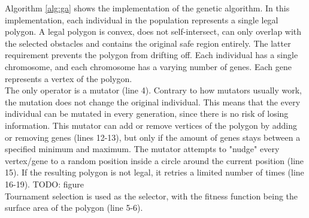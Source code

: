 Algorithm \ref{alg:ga} shows the implementation of the genetic algorithm. In this implementation, each individual in the population represents a single legal polygon. A legal polygon is convex, does not self-intersect, can only overlap with the selected obstacles and contains the original safe region entirely. The latter requirement prevents the polygon from drifting off. Each individual has a single chromosome, and each chromosome has a varying number of genes. Each gene represents a vertex of the polygon.\\
The only operator is a mutator (line 4). Contrary to how mutators usually work, the mutation does not change the original individual. This means that the every individual can be mutated in every generation, since there is no risk of losing information. This mutator can add or remove vertices of the polygon by adding or removing genes (lines 12-13), but only if the amount of genes stays between a specified minimum and maximum. The mutator attempts to "nudge" every vertex/gene to a random position inside a circle around the current position (line 15). If the resulting polygon is not legal, it retries a limited number of times (line 16-19). TODO: figure\\
Tournament selection is used as the selector, with the fitness function being the surface area of the polygon (line 5-6).